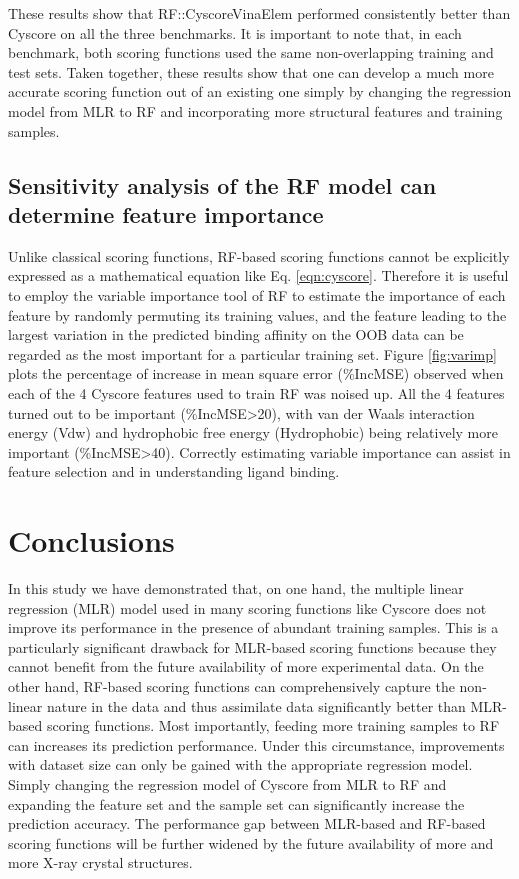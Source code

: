 \documentclass[linenumbers]{bmcart}
\begin{document}
These results show that RF::CyscoreVinaElem performed consistently better than Cyscore on all the three benchmarks. It is important to note that, in each benchmark, both scoring functions used the same non-overlapping training and test sets. Taken together, these results show that one can develop a much more accurate scoring function out of an existing one simply by changing the regression model from MLR to RF and incorporating more structural features and training samples.

\subsection*{Sensitivity analysis of the RF model can determine feature importance}

Unlike classical scoring functions, RF-based scoring functions cannot be explicitly expressed as a mathematical equation like Eq. \ref{eqn:cyscore}. Therefore it is useful to employ the variable importance tool of RF to estimate the importance of each feature by randomly permuting its training values, and the feature leading to the largest variation in the predicted binding affinity on the OOB data can be regarded as the most important for a particular training set. Figure \ref{fig:varimp} plots the percentage of increase in mean square error (\%IncMSE) observed when each of the 4 Cyscore features used to train RF was noised up. All the 4 features turned out to be important (\%IncMSE\textgreater 20), with van der Waals interaction energy (Vdw) and hydrophobic free energy (Hydrophobic) being relatively more important (\%IncMSE\textgreater 40). Correctly estimating variable importance can assist in feature selection and in understanding ligand binding.

\section*{Conclusions}

In this study we have demonstrated that, on one hand, the multiple linear regression (MLR) model used in many scoring functions like Cyscore does not improve its performance in the presence of abundant training samples. This is a particularly significant drawback for MLR-based scoring functions because they cannot benefit from the future availability of more experimental data. On the other hand, RF-based scoring functions can comprehensively capture the non-linear nature in the data and thus assimilate data significantly better than MLR-based scoring functions. Most importantly, feeding more training samples to RF can increases its prediction performance. Under this circumstance, improvements with dataset size can only be gained with the appropriate regression model. Simply changing the regression model of Cyscore from MLR to RF and expanding the feature set and the sample set can significantly increase the prediction accuracy. The performance gap between MLR-based and RF-based scoring functions will be further widened by the future availability of more and more X-ray crystal structures.
\end{document}
